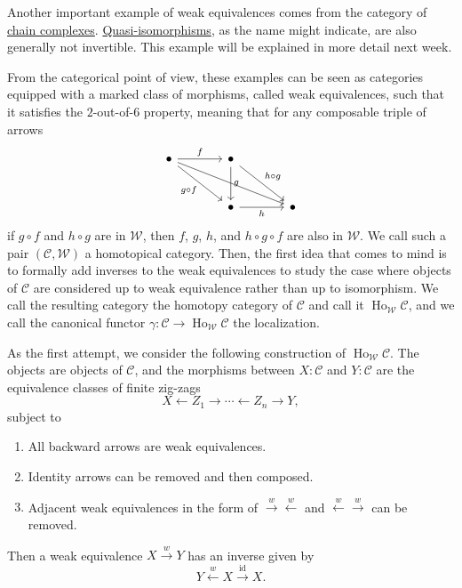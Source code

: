 \documentclass[11pt]{article}
\theoremstyle{definition}
\theoremstyle{remark}
\newcommand{\Ho}{\operatorname{Ho}}
\newcommand{\id}{\operatorname{id}}
\begin{document}
Another important example of weak equivalences comes from the category of
\href{https://ncatlab.org/nlab/show/chain+complex}{chain complexes}.
\href{https://ncatlab.org/nlab/show/quasi-isomorphism}{Quasi-isomorphisms},
as the name might indicate, are also generally not invertible. This example will be explained in more detail next week.

From the categorical point of view, these examples can be seen as categories equipped with a marked class of morphisms, called weak equivalences, such that it satisfies the \(2\)-out-of-\(6\) property, meaning that for any composable triple of arrows
\[
\begin{tikzcd}[column sep=large, row sep=large]
\bullet \arrow[r,"f"] \arrow[dr,swap," g\circ f"] \arrow[drr,swap] 
  & \bullet \arrow[d,"g"] \arrow[dr,"h\circ g"] \\
& \bullet \arrow[r,swap,"h"] & \bullet
\end{tikzcd}
\]
if \(g\circ f\) and \(h\circ g\) are in \(\mathcal{W}\), then \(f\), \(g\), \(h\), and \(h\circ g\circ f\) are also in \(\mathcal{W}\).  We call such a pair $(\mathcal{C}, \mathcal{W})$ a homotopical category. Then, the first idea that comes to mind is to formally add inverses to the weak equivalences to study the case where objects of $\mathcal{C}$ are considered up to weak equivalence rather than up to isomorphism. We call the resulting category the homotopy category of $\mathcal{C}$ and call it $\Ho_{\mathcal{W}}\mathcal{C}$, and we call the canonical functor $\gamma : \mathcal{C} \to \Ho_{\mathcal{W}}\mathcal{C}$ the localization.

As the first attempt, we consider the following construction of $\Ho_{\mathcal{W}}\mathcal{C}$.
The objects are objects of $\mathcal{C}$, and
the morphisms between $X : \mathcal{C}$ and $Y : \mathcal{C}$ are the equivalence classes of finite zig-zags
$$X \leftarrow Z_1 \rightarrow \cdots \leftarrow Z_{n} \to Y,$$
subject to
\begin{enumerate}
    \item All backward arrows are weak equivalences.
    \item Identity arrows can be removed and then composed.

    \item Adjacent weak equivalences in the form of $\stackrel{w}{\to} \stackrel{w}{\leftarrow}$ and $\stackrel{w}{\leftarrow} \stackrel{w}{\to}$ can be removed.
\end{enumerate}

Then a weak equivalence $X \stackrel{w}{\to} Y$ has an inverse given by
$$Y \stackrel{w}{\leftarrow} X \stackrel{\id}{\to} X.$$
\end{document}
